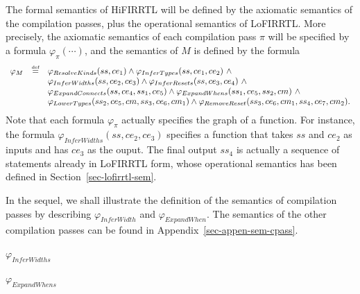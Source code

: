 The formal semantics of HiFIRRTL will be defined by the axiomatic semantics of the compilation passes, plus the operational semantics of LoFIRRTL.
%
More precisely, the axiomatic semantics of each compilation pass $\pi$ will be specified by a formula $\varphi_{\pi}(\cdots)$, and 
%
the semantics of $M$ is defined by the formula
\[
\begin{array}{l c l}
\varphi_M & \eqdef & \varphi_{ResolveKinds}(ss, ce_1)  \wedge  \varphi_{InferTypes}(ss, ce_1, ce_2)\ \wedge \\
&& \varphi_{InferWidths}(ss, ce_2, ce_3) \wedge  \varphi_{InferResets}(ss, ce_3, ce_4)\ \wedge \\
&& \varphi_{ExpandConnects}(ss, ce_4, ss_1, ce_5) \wedge \varphi_{ExpandWhens}(ss_1, ce_5, ss_2, cm)\ \wedge \\
&& \varphi_{LowerTypes}(ss_2, ce_5, cm, ss_3, ce_6, cm_1) \wedge  \varphi_{RemoveReset}(ss_3, ce_6, cm_1, ss_4, ce_7, cm_2).
\end{array}
\]
Note that each formula $\varphi_{\pi}$ actually specifies the graph of a function. For instance, the formula $\varphi_{InferWidths}(ss, ce_2, ce_3)$ specifies a function that takes $ss$ and $ce_2$ as inputs and has $ce_3$ as the ouput.  The final output $ss_4$ is actually a sequence of statements already in LoFIRRTL form, whose operational semantics has been defined in Section~\ref{sec-lofirrtl-sem}.

In the sequel, we shall illustrate the definition of the semantics of compilation passes by describing $\varphi_{InferWidth}$ and $\varphi_{ExpandWhen}$. The semantics of the other compilation passes can be found in Appendix~\ref{sec-appen-sem-cpass}.  



$\varphi_{InferWidths}$

$\varphi_{ExpandWhens}$

